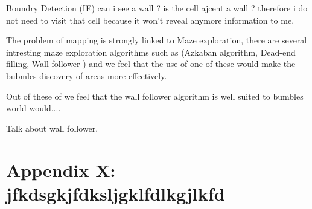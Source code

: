 \documentclass[a4paper,oneside]{report}
\begin{document}
		Boundry Detection (IE) can i see a wall ? is the cell ajcent a wall ? therefore i do not need to visit that cell because it won't reveal anymore information to me. 
	
		The problem of mapping is strongly linked to Maze exploration, there are several intresting maze exploration algorithms such as (Azkaban algorithm, Dead-end filling, Wall follower ) and we feel that the use of one of these would make the bubmles discovery of areas more effectively. 
	
		Out of these of  we feel that the wall follower algorithm is well suited to bumbles world would.... 
		
		Talk about wall follower.

\appendix
\onehalfspace

\newpage
\section{Appendix X: jfkdsgkjfdksljgklfdlkgjlkfd}
\end{document}
